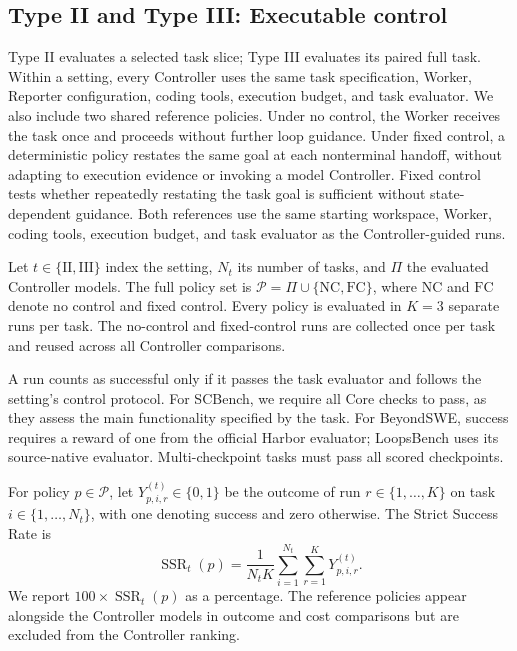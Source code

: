 \subsection{Type II and Type III: Executable control}

Type II evaluates a selected task slice; Type III evaluates its paired full task. Within a setting, every Controller uses the same task specification, Worker, Reporter configuration, coding tools, execution budget, and task evaluator. We also include two shared reference policies. Under no control, the Worker receives the task once and proceeds without further loop guidance. Under fixed control, a deterministic policy restates the same goal at each nonterminal handoff, without adapting to execution evidence or invoking a model Controller. Fixed control tests whether repeatedly restating the task goal is sufficient without state-dependent guidance. Both references use the same starting workspace, Worker, coding tools, execution budget, and task evaluator as the Controller-guided runs.







Let \(t\in\{\mathrm{II},\mathrm{III}\}\) index the setting, \(N_t\) its number of tasks, and \(\Pi\) the evaluated Controller models. The full policy set is \(\mathcal{P}=\Pi\cup\{\mathrm{NC},\mathrm{FC}\}\), where \(\mathrm{NC}\) and \(\mathrm{FC}\) denote no control and fixed control. Every policy is evaluated in \(K=3\) separate runs per task. The no-control and fixed-control runs are collected once per task and reused across all Controller comparisons.

A run counts as successful only if it passes the task evaluator and follows the setting's control protocol. For SCBench, we require all Core checks to pass, as they assess the main functionality specified by the task. For BeyondSWE, success requires a reward of one from the official Harbor evaluator; LoopsBench uses its source-native evaluator. Multi-checkpoint tasks must pass all scored checkpoints.

For policy \(p\in\mathcal{P}\), let \(Y^{(t)}_{p,i,r}\in\{0,1\}\) be the outcome of run \(r\in\{1,\ldots,K\}\) on task \(i\in\{1,\ldots,N_t\}\), with one denoting success and zero otherwise. The Strict Success Rate is
\[
\operatorname{SSR}_{t}(p)
=
\frac{1}{N_t K}
\sum_{i=1}^{N_t}
\sum_{r=1}^{K}
Y^{(t)}_{p,i,r}.
\]
We report \(100\times\operatorname{SSR}_{t}(p)\) as a percentage. The reference policies appear alongside the Controller models in outcome and cost comparisons but are excluded from the Controller ranking.

